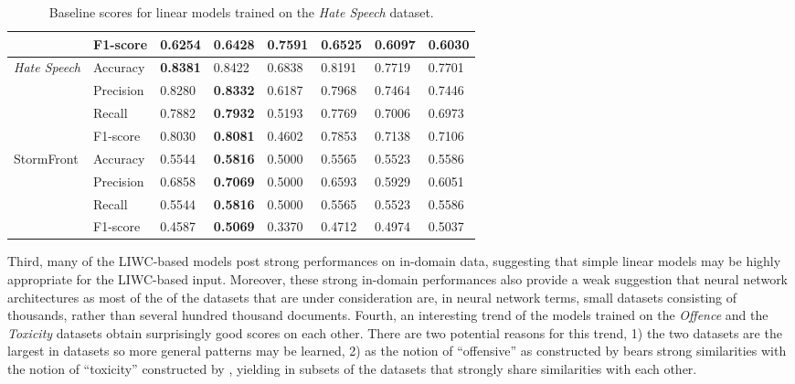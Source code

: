 \begin{table}[]
\begin{minipage}{0.42\paperheight}
{\begin{tabular}{ll|ll|ll|ll}
                                           & F1-score  & 0.6254       & 0.6428           & \bf{0.7591} & 0.6525        & 0.6097      & 0.6030      \\ \hline
    \multirow{4}{*}{\textit{Hate Speech}}  & Accuracy  & \bf{0.8381}  & 0.8422           & 0.6838      & 0.8191        & 0.7719      & 0.7701      \\
                                           & Precision & 0.8280       & \bf{0.8332}      & 0.6187      & 0.7968        & 0.7464      & 0.7446      \\
                                           & Recall    & 0.7882       & \bf{0.7932}      & 0.5193      & 0.7769        & 0.7006      & 0.6973      \\
                                           & F1-score  & 0.8030       & \bf{0.8081}      & 0.4602      & 0.7853        & 0.7138      & 0.7106      \\ \hline
    \multirow{4}{*}{StormFront}            & Accuracy  & 0.5544       & \bf{0.5816}      & 0.5000      & 0.5565        & 0.5523      & 0.5586      \\
                                           & Precision & 0.6858       & \bf{0.7069}      & 0.5000      & 0.6593        & 0.5929      & 0.6051      \\
                                           & Recall    & 0.5544       & \bf{0.5816}      & 0.5000      & 0.5565        & 0.5523      & 0.5586      \\
                                           & F1-score  & 0.4587       & \bf{0.5069}      & 0.3370      & 0.4712        & 0.4974      & 0.5037
    \end{tabular}%
    }
    \caption{Baseline scores for linear models trained on the \textit{Hate Speech} dataset.}
    \label{tab:linear_hatespeech_baselines}
\end{minipage}
\end{table}

Third, many of the LIWC-based models post strong performances on in-domain data, suggesting that simple linear models may be highly appropriate for the LIWC-based input.
Moreover, these strong in-domain performances also provide a weak suggestion that neural network architectures as most of the of the datasets that are under consideration are, in neural network terms, small datasets consisting of thousands, rather than several hundred thousand documents.
Fourth, an interesting trend of the models trained on the \textit{Offence} and the \textit{Toxicity} datasets obtain surprisingly good scores on each other. There are two potential reasons for this trend, 1) the two datasets are the largest in datasets so more general patterns may be learned, 2) as the notion of ``offensive'' as constructed by \citet{Davidson:2017} bears strong similarities with the notion of ``toxicity'' constructed by \citet{Wulczyn:2017}, yielding in subsets of the datasets that strongly share similarities with each other.

